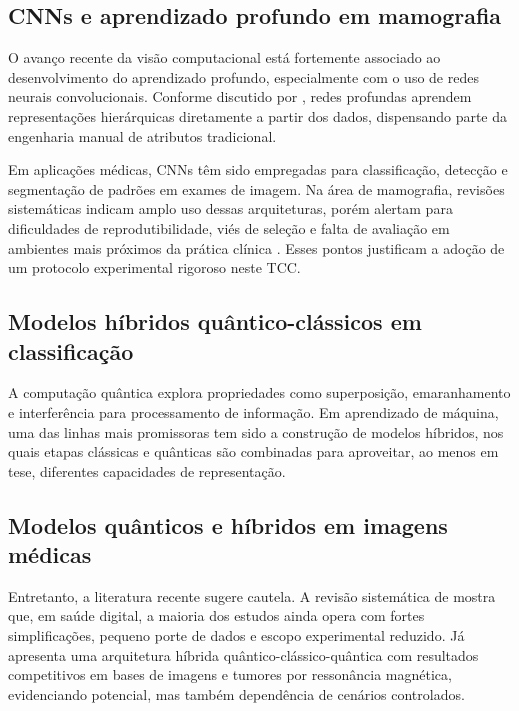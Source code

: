 \documentclass[
    12pt,
    openright,
    oneside,
    a4paper,
    english,
    brazil
]{abntex2}
\begin{document}
\subsection{CNNs e aprendizado profundo em mamografia}

O avanço recente da visão computacional está fortemente associado ao desenvolvimento do aprendizado profundo, especialmente com o uso de redes neurais convolucionais. Conforme discutido por , redes profundas aprendem representações hierárquicas diretamente a partir dos dados, dispensando parte da engenharia manual de atributos tradicional.

Em aplicações médicas, CNNs têm sido empregadas para classificação, detecção e segmentação de padrões em exames de imagem. Na área de mamografia, revisões sistemáticas indicam amplo uso dessas arquiteturas, porém alertam para dificuldades de reprodutibilidade, viés de seleção e falta de avaliação em ambientes mais próximos da prática clínica \cite{Bhalla2023MammographyReview}. Esses pontos justificam a adoção de um protocolo experimental rigoroso neste TCC.

\subsection{Modelos híbridos quântico-clássicos em classificação}

A computação quântica explora propriedades como superposição, emaranhamento e interferência para processamento de informação. Em aprendizado de máquina, uma das linhas mais promissoras tem sido a construção de modelos híbridos, nos quais etapas clássicas e quânticas são combinadas para aproveitar, ao menos em tese, diferentes capacidades de representação.

\subsection{Modelos quânticos e híbridos em imagens médicas}

Entretanto, a literatura recente sugere cautela. A revisão sistemática de  mostra que, em saúde digital, a maioria dos estudos ainda opera com fortes simplificações, pequeno porte de dados e escopo experimental reduzido. Já  apresenta uma arquitetura híbrida quântico-clássico-quântica com resultados competitivos em bases de imagens e tumores por ressonância magnética, evidenciando potencial, mas também dependência de cenários controlados.
\end{document}
